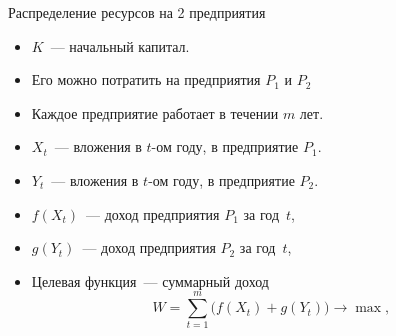 \documentclass[unicode,11pt,notheorems,xcolor=table]{beamer}
\begin{document}
\begin{frame}{Распределение ресурсов на 2 предприятия}
\begin{itemize}
\item 
	$K$~--- начальный капитал.     

\item 
	Его можно потратить на предприятия	$P_1$ и $P_2$

\item 
 Каждое предприятие работает в течении $m$ лет.
  
\item 
	$X_{t}$~--- вложения в $t$-ом году, в предприятие $P_1$. 
\item 
	$Y_{t}$~--- вложения в $t$-ом году, в предприятие $P_2$. 
\item 
	$f(X_{t})$~--- доход предприятия $P_1$ за год~$t$,
\item 
	$g(Y_{t})$~--- доход предприятия $P_2$ за год~$t$,
\item  
\alert{Целевая функция~--- суммарный доход
$$
	W= \sum_{t=1}^m \big( f(X_t)+g(Y_t) \big) \to \max,
$$ 
}
\end{itemize}
\end{frame}
\end{document}
